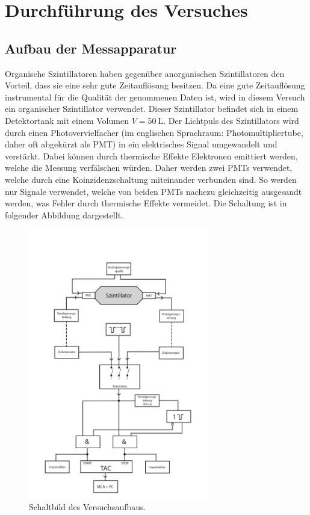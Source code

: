 \section{Durchführung des Versuches}
\label{sec:Durchführung}
\subsection{Aufbau der Messapparatur}
\label{subsec:Aufbau}
Organische Szintillatoren haben gegenüber anorganischen Szintillatoren den Vorteil, dass sie eine sehr
gute Zeitauflösung besitzen. Da eine gute Zeitauflösung instrumental für die Qualität der genommenen
Daten ist, wird in diesem Versuch ein organischer Szintillator verwendet.
Dieser Szintillator befindet sich in einem Detektortank mit einem Volumen $V = \SI{50}{\liter}$.
Der Lichtpuls des Szintillators wird durch einen Photovervielfacher (im englischen Sprachraum: Photomultipliertube,
daher oft abgekürzt als PMT) in ein elektrisches Signal umgewandelt und verstärkt.
Dabei können durch thermische Effekte Elektronen emittiert werden, welche die
Messung verfälschen würden. Daher werden zwei PMTs verwendet, welche durch eine
Koinzidenzschaltung miteinander verbunden sind. So werden nur Signale verwendet, welche
von beiden PMTs nachezu gleichzeitig ausgesandt werden, was Fehler durch thermische
Effekte vermeidet.
Die Schaltung ist in folgender Abbildung dargestellt.
\begin{figure}[H]
  \centering
    \includegraphics[width=0.7\textwidth]{pictures/Schaltbild.png}
    \caption{Schaltbild des Versuchsaufbaus. \cite{versuchsbeschreibung}}
    \label{fig:Schaltbild}
\end{figure}
